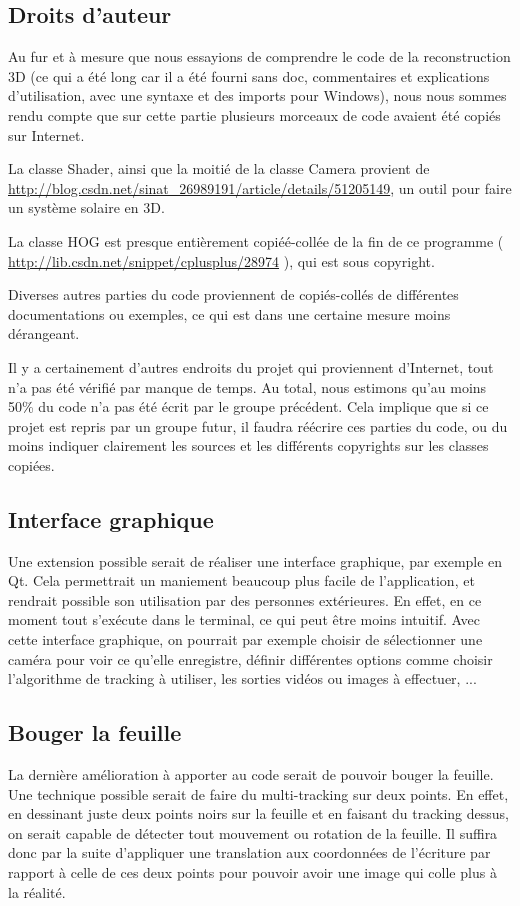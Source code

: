 \subsection{Droits d'auteur}
Au fur et à mesure que nous essayions de comprendre le code de la reconstruction 3D (ce qui a été long car il a été fourni sans doc, commentaires et explications d'utilisation, avec une syntaxe et des imports pour Windows), nous nous sommes rendu compte que sur cette partie plusieurs morceaux de code avaient été copiés sur Internet.

La classe Shader, ainsi que la moitié de la classe Camera provient de \url{http://blog.csdn.net/sinat_26989191/article/details/51205149}, un outil pour faire un système solaire en 3D.

La classe HOG est presque entièrement copiéé-collée de la fin de ce programme ( \url{http://lib.csdn.net/snippet/cplusplus/28974} ), qui est sous copyright.

Diverses autres parties du code proviennent de copiés-collés de différentes documentations ou exemples, ce qui est dans une certaine mesure moins dé\-ran\-geant.

Il y a certainement d'autres endroits du projet qui proviennent d'Internet, tout n'a pas été vérifié par manque de temps. Au total, nous estimons qu'au moins 50\% du code n'a pas été écrit par le groupe précédent. Cela implique que si ce projet est repris par un groupe futur, il faudra réécrire ces parties du code, ou du moins indiquer clairement les sources et les différents copyrights sur les classes copiées.

\subsection{Interface graphique}

Une extension possible serait de réaliser une interface graphique, par exemple en Qt. Cela permettrait un maniement beaucoup plus facile de l'application, et rendrait possible son utilisation par des personnes extérieures. En effet, en ce moment tout s'exécute dans le terminal, ce qui peut être moins intuitif. Avec cette interface graphique, on pourrait par exemple choisir de sélectionner une caméra pour voir ce qu'elle enregistre, définir différentes options comme choisir l'algorithme de tracking à utiliser, les sorties vidéos ou images à effectuer, ...

\subsection{Bouger la feuille}

La dernière amélioration à apporter au code serait de pouvoir bouger la feuille. Une technique possible serait de faire du multi-tracking sur deux points. En effet, en dessinant juste deux points noirs sur la feuille et en faisant du tracking dessus, on serait capable de détecter tout mouvement ou rotation de la feuille. Il suffira donc par la suite d'appliquer une translation aux coordonnées de l'écriture par rapport à celle de ces deux points pour pouvoir avoir une image qui colle plus à la réalité.